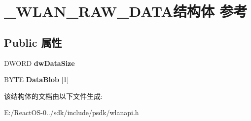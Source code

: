 \hypertarget{struct___w_l_a_n___r_a_w___d_a_t_a}{}\section{\+\_\+\+W\+L\+A\+N\+\_\+\+R\+A\+W\+\_\+\+D\+A\+T\+A结构体 参考}
\label{struct___w_l_a_n___r_a_w___d_a_t_a}
\subsection*{Public 属性}
\begin{DoxyCompactItemize}
\item 
\mbox{\label{struct___w_l_a_n___r_a_w___d_a_t_a_a6ae34d915240dbb817053b69dd3e1442}} 
D\+W\+O\+RD {\bfseries dw\+Data\+Size}
\item 
\mbox{\label{struct___w_l_a_n___r_a_w___d_a_t_a_ad75e9c26f1c55996d49c43c1a1e09f79}} 
B\+Y\+TE {\bfseries Data\+Blob} \mbox{[}1\mbox{]}
\end{DoxyCompactItemize}


该结构体的文档由以下文件生成\+:\begin{DoxyCompactItemize}
\item 
E\+:/\+React\+O\+S-\/0../sdk/include/psdk/wlanapi.\+h\end{DoxyCompactItemize}
